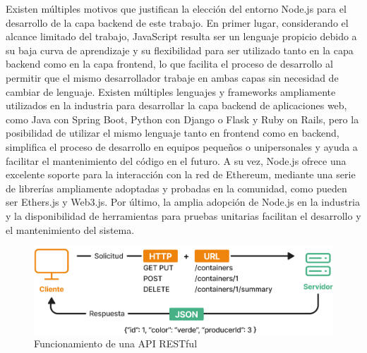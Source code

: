 Existen múltiples motivos que justifican la elección del entorno Node.js para el desarrollo de la capa backend de este trabajo. En primer lugar, considerando el alcance limitado del trabajo, JavaScript resulta ser un lenguaje propicio debido a su baja curva de aprendizaje y su flexibilidad para ser utilizado tanto en la capa backend como en la capa frontend, lo que facilita el proceso de desarrollo al permitir que el mismo desarrollador trabaje en ambas capas sin necesidad de cambiar de lenguaje. Existen múltiples lenguajes y frameworks ampliamente utilizados en la industria para desarrollar la capa backend de aplicaciones web, como Java con Spring Boot, Python con Django o Flask y Ruby on Rails, pero la posibilidad de utilizar el mismo lenguaje tanto en frontend como en backend, simplifica el proceso de desarrollo en equipos pequeños o unipersonales y ayuda a facilitar el mantenimiento del código en el futuro. A su vez, Node.js ofrece una excelente soporte para la interacción con la red de Ethereum, mediante una serie de librerías ampliamente adoptadas y probadas en la comunidad, como pueden ser Ethers.js y Web3.js. Por último, la amplia adopción de Node.js en la industria y la disponibilidad de herramientas para pruebas unitarias facilitan el desarrollo y el mantenimiento del sistema. 

\begin{figure}[!htb]
    \centering
    \includegraphics[width=\linewidth]{Figures/backend-api-rest.png}
    \caption{Funcionamiento de una API RESTful}
    \label{fig:api-rest}
\end{figure}


